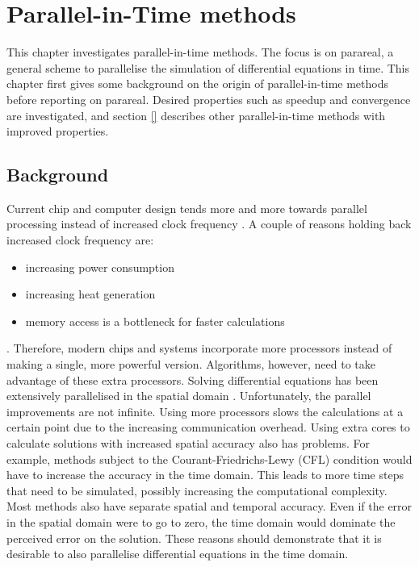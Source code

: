 \chapter{Parallel-in-Time methods}
\label{cha: pint}
This chapter investigates parallel-in-time methods. The focus is on parareal, a general scheme to parallelise the simulation of differential equations in time. This chapter first gives some background on the origin of parallel-in-time methods before reporting on parareal. Desired properties such as speedup and convergence are investigated, and section \ref{} describes other parallel-in-time methods with improved properties.
\section{Background}
\label{sec: pint background}
Current chip and computer design tends more and more towards parallel processing instead of increased clock frequency \cite{bautista_intel_nodate}. A couple of reasons holding back increased clock frequency are: 
\begin{itemize}
    \item increasing power consumption
    \item increasing heat generation
    \item memory access is a bottleneck for faster calculations
\end{itemize}
. Therefore, modern chips and systems incorporate more processors instead of making a single, more powerful version. 
Algorithms, however, need to take advantage of these extra processors. Solving differential equations has been extensively parallelised in the spatial domain \cite{adams_parallel_1999,du_expandable_2020}. Unfortunately, the parallel improvements are not infinite. Using more processors slows the calculations at a certain point due to the increasing communication overhead. Using extra cores to calculate solutions with increased spatial accuracy also has problems. For example, methods subject to the Courant-Friedrichs-Lewy (CFL) \cite{courant_uber_1928} condition would have to increase the accuracy in the time domain. This leads to more time steps that need to be simulated, possibly increasing the computational complexity. Most methods also have separate spatial and temporal accuracy. Even if the error in the spatial domain were to go to zero, the time domain would dominate the perceived error on the solution. These reasons should demonstrate that it is desirable to also parallelise differential equations in the time domain. 

